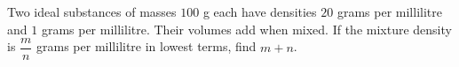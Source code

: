 Two ideal substances of masses $100$ g each have densities $20$ grams per millilitre and $1$ grams per millilitre. Their volumes add when mixed. If the mixture density is $\dfrac{m}{n}$ grams per millilitre in lowest terms, find $m+n$.
